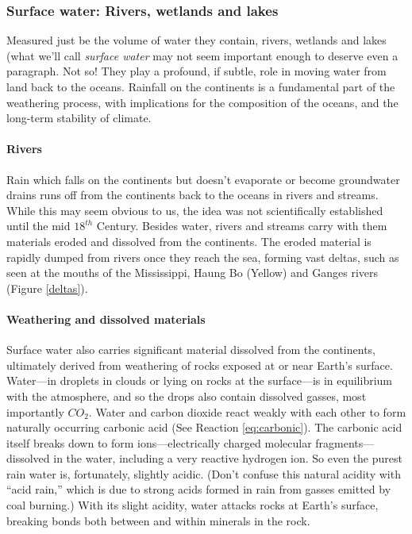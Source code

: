 \documentclass[amstex,12pt]{book}
\begin{document}
\subsubsection{Surface water: Rivers, wetlands and lakes} \label{swrwl}
Measured just be the volume of water they contain, rivers, wetlands and lakes (what we'll call \emph{surface water} may not seem important enough to deserve even a paragraph. Not so! They play a profound, if subtle, role in moving water from land back to the oceans. Rainfall on the continents is a fundamental part of the weathering process, with implications for the composition of the oceans, and the long-term stability of climate.

\paragraph{Rivers} Rain which falls on the continents but doesn't evaporate or become groundwater drains runs off from the continents back to the oceans in rivers and streams. While this may seem obvious to us, the idea was not scientifically established until the mid $18^{th}$ Century. Besides water, rivers and streams carry with them materials eroded and dissolved from the continents. The eroded material is rapidly dumped from rivers once they reach the sea, forming vast deltas, such as seen at the mouths of the Mississippi, Haung Bo (Yellow) and Ganges rivers (Figure \ref{deltas}).
\paragraph{Weathering and dissolved materials} Surface water also carries significant material dissolved from the continents, ultimately derived from weathering of rocks exposed at or near Earth's surface. Water---in droplets in clouds or lying on rocks at the surface---is in equilibrium with the atmosphere, and so the drops also contain dissolved gasses, most importantly $CO_2$. Water and carbon dioxide react weakly with each other to form naturally occurring carbonic acid (See Reaction \ref{eq:carbonic}). The carbonic acid itself breaks down to form ions---electrically charged molecular fragments---dissolved in the water, including a very reactive hydrogen ion. So even the purest rain water is, fortunately, slightly acidic. (Don't confuse this natural acidity with ``acid rain,'' which is due to strong acids formed in rain from gasses emitted by coal burning.) With its slight acidity, water attacks rocks at Earth's surface, breaking bonds both between and within minerals in the rock.       
   
\end{document}
